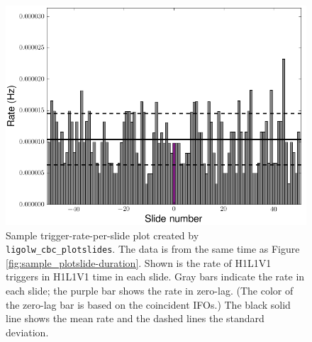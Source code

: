 \begin{figure}[p]
\label{fig:sample_plotslide-rate}
\begin{center}
\includegraphics[width=5in]{figures/H1L1V1-ligolw_cbc_plotslides_FULL_DATA_CAT_4_VETO_H1L1V1_rates_ALL_DATA_PLOTTED_OPEN_BOX-931035296-4763191.png}
\end{center}
\caption{Sample trigger-rate-per-slide plot created by \texttt{ligolw\_cbc\_plotslides}. The data is from the same time as Figure \ref{fig:sample_plotslide-duration}. Shown is the rate of H1L1V1 triggers in H1L1V1 time in each slide. Gray bars indicate the rate in each slide; the purple bar shows the rate in zero-lag. (The color of the zero-lag bar is based on the coincident \acp{IFO}.) The black solid line shows the mean rate and the dashed lines the standard deviation.}
\end{figure}

